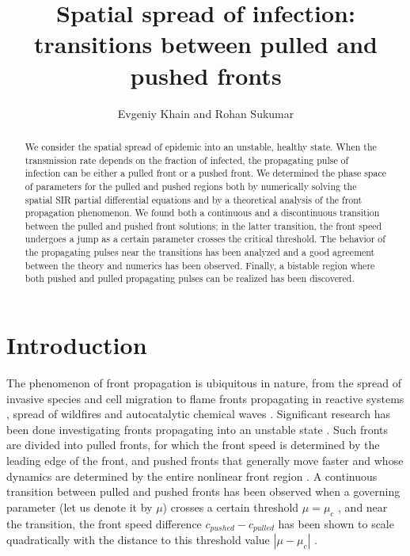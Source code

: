 \documentclass[pre,aps,twocolumn,showpacs]{revtex4}
\begin{document}
\title{Spatial spread of infection: transitions between pulled and pushed fronts}

\author{Evgeniy Khain and Rohan Sukumar}

\begin{abstract}
We consider the spatial spread of epidemic into an unstable, healthy state. When the transmission rate depends on the fraction of infected, the propagating pulse of infection can be either a pulled front or a pushed front. We determined the phase space of parameters for the pulled and pushed regions both by numerically solving the spatial SIR partial differential equations and by a theoretical analysis of the front propagation phenomenon. We found both a continuous and a discontinuous transition between the pulled and pushed front solutions; in the latter transition, the front speed undergoes a jump as a certain parameter crosses the critical threshold. The behavior of the propagating pulses near the transitions has been analyzed and a good agreement between the theory and numerics has been observed. Finally, a bistable region where both pushed and pulled propagating pulses can be realized has been discovered.
\end{abstract}

\maketitle

\section{Introduction}

The phenomenon of front propagation is ubiquitous in nature, from the spread of invasive species \cite{invasive} and cell migration \cite{migration} to flame fronts propagating in reactive systems \cite{flame}, spread of wildfires \cite{fire} and autocatalytic chemical waves \cite{chemwaves}. Significant research has been done investigating fronts propagating into an unstable state \cite{Saarloos}. Such fronts are divided into pulled fronts, for which the front speed is determined by the leading edge of the front, and pushed fronts that generally move faster and whose dynamics are determined by the entire nonlinear front region \cite{Saarloos}. A continuous transition between pulled and pushed fronts has been observed when a governing parameter (let us denote it by $\mu$) crosses a certain threshold $\mu = \mu_c$ \cite{Saarloos,Korolev}, and near the transition, the front speed difference $c_{pushed}-c_{pulled}$ has been shown to scale quadratically with the distance to this threshold value $|\mu-\mu_c|$ \cite{Scheel}.
\end{document}

